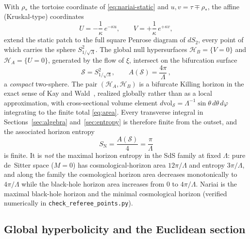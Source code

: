 \documentclass[11pt]{article}
\begin{document}
With $\rho_*$ the tortoise coordinate of \eqref{eq:nariai-static} and $u,v = \tau \mp \rho_*$, the affine (Kruskal-type) coordinates
\begin{equation}
U = -\frac{1}{\kappa}\,e^{-\kappa u},
\qquad
V = +\frac{1}{\kappa}\,e^{+\kappa v},
\end{equation}
extend the static patch to the full square Penrose diagram of $dS_2$, every point of which carries the sphere $S^2_{1/\sqrt{\Lambda}}$. The global null hypersurfaces $\mathcal{H}_B = \{V = 0\}$ and $\mathcal{H}_A = \{U = 0\}$, generated by the flow of $\xi$, intersect on the bifurcation surface
\begin{equation}
\mathcal{S} = S^2_{1/\sqrt{\Lambda}},
\qquad
A(\mathcal{S}) = \frac{4\pi}{\Lambda}\,,
\label{eq:area}
\end{equation}
a \emph{compact} two-sphere. The pair $(\mathcal{H}_A, \mathcal{H}_B)$ is a bifurcate Killing horizon in the exact sense of Kay and Wald~\cite{KayWald}, realized globally rather than as a local approximation, with cross-sectional volume element $d\mathrm{vol}_{\mathcal{S}} = \Lambda^{-1}\sin\theta\, d\theta\, d\varphi$ integrating to the finite total \eqref{eq:area}. Every transverse integral in Sections~\ref{sec:algebra} and~\ref{sec:entropy} is therefore finite from the outset, and the associated horizon entropy
\begin{equation}
S_{\mathrm{N}} = \frac{A(\mathcal{S})}{4} = \frac{\pi}{\Lambda}
\label{eq:Smax}
\end{equation}
is finite. It is \emph{not} the maximal horizon entropy in the SdS family at fixed $\Lambda$: pure de~Sitter space ($M=0$) has cosmological-horizon area $12\pi/\Lambda$ and entropy $3\pi/\Lambda$, and along the family the cosmological horizon area decreases monotonically to $4\pi/\Lambda$ while the black-hole horizon area increases from $0$ to $4\pi/\Lambda$. Nariai is the maximal black-hole horizon and the minimal cosmological horizon (verified numerically in \texttt{check\_referee\_points.py}).

\subsection{Global hyperbolicity and the Euclidean section}
\end{document}
